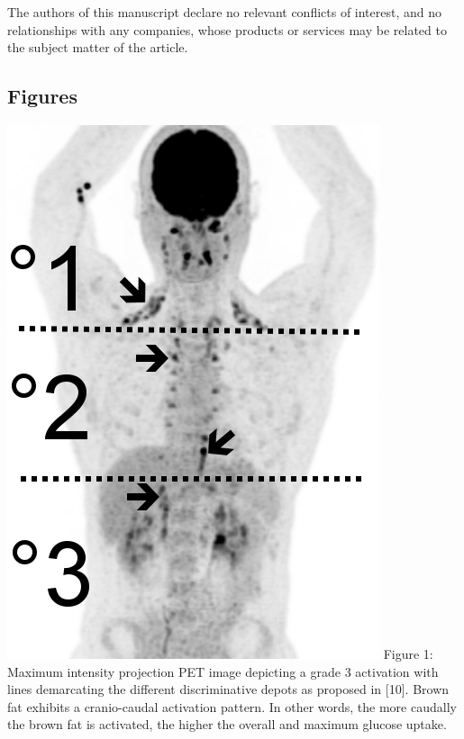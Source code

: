 \documentclass[]{elsarticle} %
\makeatletter
\def\maxwidth{\ifdim\Gin@nat@width>\linewidth\linewidth
\else\Gin@nat@width\fi}
\let\Oldincludegraphics\includegraphics
\renewcommand{\includegraphics}[1]{\Oldincludegraphics[width=\maxwidth]{#1}}
\makeatother
\begin{document}
The authors of this manuscript declare no relevant conflicts of
interest, and no relationships with any companies, whose products or
services may be related to the subject matter of the article.

\subsection{Figures}\label{figures}

\includegraphics{Figure_grading.png} Figure 1: Maximum intensity
projection PET image depicting a grade 3 activation with lines
demarcating the different discriminative depots as proposed in {[}10{]}.
Brown fat exhibits a cranio-caudal activation pattern. In other words,
the more caudally the brown fat is activated, the higher the overall and
maximum glucose uptake.

\pagebreak
\end{document}
